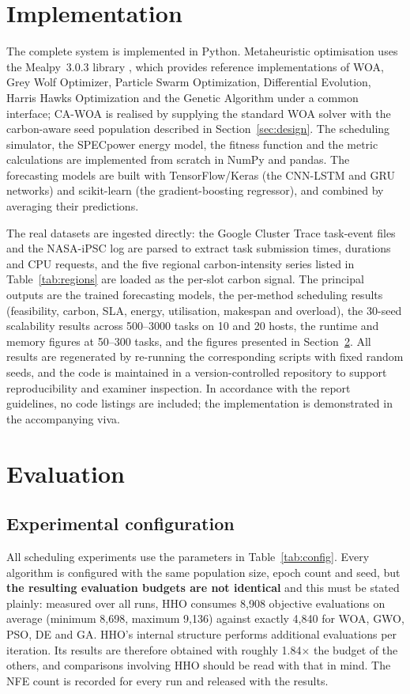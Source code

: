 \documentclass[12pt,a4paper]{article}
\begin{document}
\section{Implementation}\label{sec:impl}
The complete system is implemented in Python. Metaheuristic optimisation uses the Mealpy~3.0.3 library
\cite{vanthieu2023mealpy}, which provides reference implementations of WOA, Grey Wolf Optimizer, Particle Swarm
Optimization, Differential Evolution, Harris Hawks Optimization and the Genetic Algorithm under a common
interface; CA-WOA is realised by supplying the standard WOA solver with the carbon-aware seed population
described in Section~\ref{sec:design}. The scheduling simulator, the SPECpower energy model, the fitness
function and the metric calculations are implemented from scratch in NumPy and pandas. The forecasting models
are built with TensorFlow/Keras (the CNN-LSTM and GRU networks) and scikit-learn (the gradient-boosting
regressor), and combined by averaging their predictions.

The real datasets are ingested directly: the Google Cluster Trace task-event files and the NASA-iPSC log are
parsed to extract task submission times, durations and CPU requests, and the five regional carbon-intensity
series listed in Table~\ref{tab:regions} are loaded as the per-slot carbon signal. The principal outputs are
the trained forecasting models, the per-method scheduling results (feasibility, carbon, SLA, energy,
utilisation, makespan and overload), the 30-seed scalability results across 500--3000 tasks on 10 and 20
hosts, the runtime and memory figures at 50--300 tasks, and the figures presented in
Section~\ref{sec:eval}. All results are regenerated by re-running
the corresponding scripts with fixed random seeds, and the code is maintained in a version-controlled
repository to support reproducibility and examiner inspection. In accordance with the report guidelines, no
code listings are included; the implementation is demonstrated in the accompanying viva.

\section{Evaluation}\label{sec:eval}
\subsection{Experimental configuration}\label{sec:config}
All scheduling experiments use the parameters in Table~\ref{tab:config}. Every algorithm is configured with
the same population size, epoch count and seed, but \textbf{the resulting evaluation budgets are not
identical} and this must be stated plainly: measured over all runs, HHO consumes 8{,}908 objective evaluations
on average (minimum 8{,}698, maximum 9{,}136) against exactly 4{,}840 for WOA, GWO, PSO, DE and GA. HHO's
internal structure performs additional evaluations per iteration. Its results are therefore obtained with
roughly 1.84$\times$ the budget of the others, and comparisons involving HHO should be read with that in mind.
The NFE count is recorded for every run and released with the results.
\end{document}
